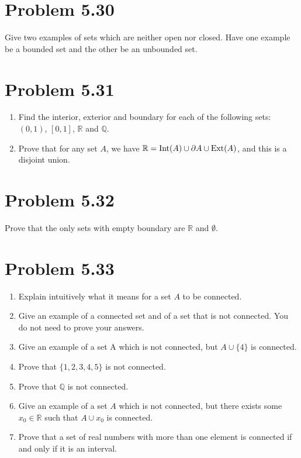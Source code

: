 \documentclass[12pt]{report}
\begin{document}
\section{Problem 5.30}
    Give two examples of sets which are neither open nor closed. 
    Have one example be a bounded set and the other be an unbounded set. 

\section{Problem 5.31}
    \begin{enumerate}[label=(\alph*)]
        \item   Find the interior, exterior and boundary for each of the following  sets: $(0, 1)$, $[0, 1]$, $\mathbb{R}$ and $\mathbb{Q}$. 
        \item   Prove that for any set $A$, we have $\mathbb{R} = \text{Int}(A) \cup \partial A \cup \text{Ext}(A)$,  and this is a disjoint union. 
    \end{enumerate}

\section{Problem 5.32}
    Prove that the only sets with empty boundary are $\mathbb{R}$ and $\emptyset$.
\pagebreak

\section{Problem 5.33}
    \begin{enumerate}[label=(\alph*)]
        \item   Explain intuitively what it means for a set $A$ to be connected. 
        \item   Give an example of a connected set and of a set that is not  connected. You do not need to prove your answers. 
        \item   Give an example of a set A which is not connected, but $A \cup \{4\}$ is connected.
        \item   Prove that $\{1, 2, 3, 4, 5\}$ is not connected.
        \item   Prove that $\mathbb{Q}$ is not connected.
        \item   Give an example of a set $A$ which is not connected, but there exists some $x_0 \in \mathbb{R}$ such that $A \cup {x_0}$ is connected. 
        \item   Prove that a set of real numbers with more than one element is connected if and only if it is an interval. 
    \end{enumerate}
\end{document}
